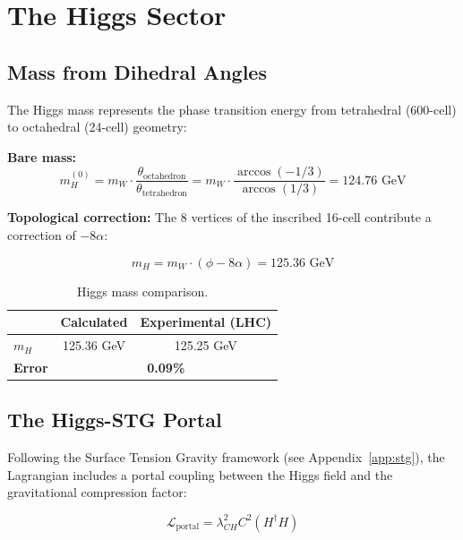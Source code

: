 \documentclass[12pt,a4paper]{article}
\begin{document}
\section{The Higgs Sector}

\subsection{Mass from Dihedral Angles}

The Higgs mass represents the phase transition energy from tetrahedral (600-cell) to octahedral (24-cell) geometry:

\textbf{Bare mass:}
\begin{equation}
m_H^{(0)} = m_W \cdot \frac{\theta_{\text{octahedron}}}{\theta_{\text{tetrahedron}}} = m_W \cdot \frac{\arccos(-1/3)}{\arccos(1/3)} = 124.76 \text{ GeV}
\end{equation}

\textbf{Topological correction:}
The 8 vertices of the inscribed 16-cell contribute a correction of $-8\alpha$:

\begin{equation}
\boxed{m_H = m_W \cdot (\phi - 8\alpha) = 125.36 \text{ GeV}}
\end{equation}

\begin{table}[H]
\centering
\begin{tabular}{lcc}
\toprule
& \textbf{Calculated} & \textbf{Experimental (LHC)} \\
\midrule
$m_H$ & 125.36 GeV & 125.25 GeV \\
\textbf{Error} & \multicolumn{2}{c}{\textbf{0.09\%}} \\
\bottomrule
\end{tabular}
\caption{Higgs mass comparison.}
\end{table}

\subsection{The Higgs-STG Portal}

Following the Surface Tension Gravity framework \cite{oneill2025stg,oneill2025gps,oneill2025scaffold} (see Appendix~\ref{app:stg}), the Lagrangian includes a portal coupling between the Higgs field and the gravitational compression factor:

\begin{equation}
\mathcal{L}_{\text{portal}} = \lambda_{CH}^2 C^2 (H^\dagger H)
\end{equation}
\end{document}
